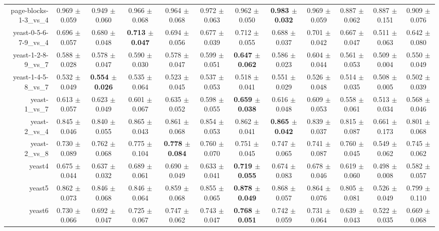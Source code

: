 \begin{table}[!ht]
{\begin{tabular}{r c c c c c c c c c c c}
page-blocks-1-3\_vs\_4 & 0.969 $\pm$ 0.059 & 0.949 $\pm$ 0.060 & 0.966 $\pm$ 0.068 & 0.964 $\pm$ 0.068 & 0.972 $\pm$ 0.063 & 0.962 $\pm$ 0.050 & \textbf{0.983 $\pm$ 0.032} & 0.969 $\pm$ 0.059 & 0.887 $\pm$ 0.062 & 0.887 $\pm$ 0.151 & 0.909 $\pm$ 0.076 \\
yeast-0-5-6-7-9\_vs\_4 & 0.696 $\pm$ 0.057 & 0.680 $\pm$ 0.048 & \textbf{0.713 $\pm$ 0.047} & 0.694 $\pm$ 0.056 & 0.677 $\pm$ 0.039 & 0.712 $\pm$ 0.055 & 0.688 $\pm$ 0.037 & 0.701 $\pm$ 0.042 & 0.667 $\pm$ 0.047 & 0.511 $\pm$ 0.063 & 0.642 $\pm$ 0.080 \\
yeast-1-2-8-9\_vs\_7 & 0.588 $\pm$ 0.028 & 0.578 $\pm$ 0.047 & 0.590 $\pm$ 0.030 & 0.578 $\pm$ 0.047 & 0.599 $\pm$ 0.051 & \textbf{0.647 $\pm$ 0.062} & 0.586 $\pm$ 0.023 & 0.604 $\pm$ 0.044 & 0.561 $\pm$ 0.053 & 0.509 $\pm$ 0.004 & 0.550 $\pm$ 0.049 \\
yeast-1-4-5-8\_vs\_7 & 0.532 $\pm$ 0.049 & \textbf{0.554 $\pm$ 0.026} & 0.535 $\pm$ 0.064 & 0.523 $\pm$ 0.045 & 0.537 $\pm$ 0.053 & 0.518 $\pm$ 0.041 & 0.551 $\pm$ 0.029 & 0.526 $\pm$ 0.048 & 0.514 $\pm$ 0.035 & 0.508 $\pm$ 0.005 & 0.502 $\pm$ 0.039 \\
yeast-1\_vs\_7 & 0.613 $\pm$ 0.057 & 0.623 $\pm$ 0.049 & 0.601 $\pm$ 0.067 & 0.635 $\pm$ 0.052 & 0.598 $\pm$ 0.055 & \textbf{0.659 $\pm$ 0.038} & 0.616 $\pm$ 0.048 & 0.609 $\pm$ 0.053 & 0.558 $\pm$ 0.061 & 0.513 $\pm$ 0.034 & 0.568 $\pm$ 0.046 \\
yeast-2\_vs\_4 & 0.845 $\pm$ 0.046 & 0.840 $\pm$ 0.055 & 0.865 $\pm$ 0.043 & 0.861 $\pm$ 0.068 & 0.854 $\pm$ 0.053 & 0.862 $\pm$ 0.041 & \textbf{0.865 $\pm$ 0.042} & 0.839 $\pm$ 0.037 & 0.815 $\pm$ 0.087 & 0.661 $\pm$ 0.173 & 0.801 $\pm$ 0.068 \\
yeast-2\_vs\_8 & 0.730 $\pm$ 0.089 & 0.762 $\pm$ 0.068 & 0.775 $\pm$ 0.104 & \textbf{0.778 $\pm$ 0.084} & 0.760 $\pm$ 0.070 & 0.751 $\pm$ 0.045 & 0.747 $\pm$ 0.065 & 0.741 $\pm$ 0.087 & 0.760 $\pm$ 0.045 & 0.549 $\pm$ 0.062 & 0.745 $\pm$ 0.062 \\
yeast4 & 0.675 $\pm$ 0.044 & 0.637 $\pm$ 0.032 & 0.689 $\pm$ 0.061 & 0.690 $\pm$ 0.049 & 0.633 $\pm$ 0.041 & \textbf{0.719 $\pm$ 0.055} & 0.674 $\pm$ 0.083 & 0.678 $\pm$ 0.046 & 0.619 $\pm$ 0.060 & 0.498 $\pm$ 0.008 & 0.582 $\pm$ 0.057 \\
yeast5 & 0.862 $\pm$ 0.073 & 0.846 $\pm$ 0.068 & 0.846 $\pm$ 0.064 & 0.859 $\pm$ 0.068 & 0.855 $\pm$ 0.065 & \textbf{0.878 $\pm$ 0.049} & 0.868 $\pm$ 0.057 & 0.864 $\pm$ 0.076 & 0.805 $\pm$ 0.081 & 0.526 $\pm$ 0.049 & 0.799 $\pm$ 0.110 \\
yeast6 & 0.730 $\pm$ 0.066 & 0.692 $\pm$ 0.047 & 0.725 $\pm$ 0.067 & 0.747 $\pm$ 0.062 & 0.743 $\pm$ 0.047 & \textbf{0.768 $\pm$ 0.051} & 0.742 $\pm$ 0.059 & 0.731 $\pm$ 0.064 & 0.639 $\pm$ 0.043 & 0.522 $\pm$ 0.035 & 0.669 $\pm$ 0.068 \\

\end{tabular}}
\end{table}
